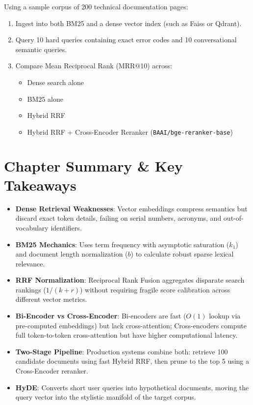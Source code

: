 \begin{tryityourselfbox}
Using a sample corpus of 200 technical documentation pages:
\begin{enumerate}
  \item Ingest into both BM25 and a dense vector index (such as Faiss or Qdrant).
  \item Query 10 hard queries containing exact error codes and 10 conversational semantic queries.
  \item Compare Mean Reciprocal Rank (MRR@10) across:
  \begin{itemize}
    \item Dense search alone
    \item BM25 alone
    \item Hybrid RRF
    \item Hybrid RRF + Cross-Encoder Reranker (\texttt{BAAI/bge-reranker-base})
  \end{itemize}
\end{enumerate}
\end{tryityourselfbox}

\section{Chapter Summary \& Key Takeaways}
\begin{itemize}[leftmargin=18pt]
  \item \textbf{Dense Retrieval Weaknesses}: Vector embeddings compress semantics but discard exact token details, failing on serial numbers, acronyms, and out-of-vocabulary identifiers.
  \item \textbf{BM25 Mechanics}: Uses term frequency with asymptotic saturation ($k_1$) and document length normalization ($b$) to calculate robust sparse lexical relevance.
  \item \textbf{RRF Normalization}: Reciprocal Rank Fusion aggregates disparate search rankings ($1 / (k + r)$) without requiring fragile score calibration across different vector metrics.
  \item \textbf{Bi-Encoder vs Cross-Encoder}: Bi-encoders are fast ($O(1)$ lookup via pre-computed embeddings) but lack cross-attention; Cross-encoders compute full token-to-token cross-attention but have higher computational latency.
  \item \textbf{Two-Stage Pipeline}: Production systems combine both: retrieve 100 candidate documents using fast Hybrid RRF, then prune to the top 5 using a Cross-Encoder reranker.
  \item \textbf{HyDE}: Converts short user queries into hypothetical documents, moving the query vector into the stylistic manifold of the target corpus.
\end{itemize}

